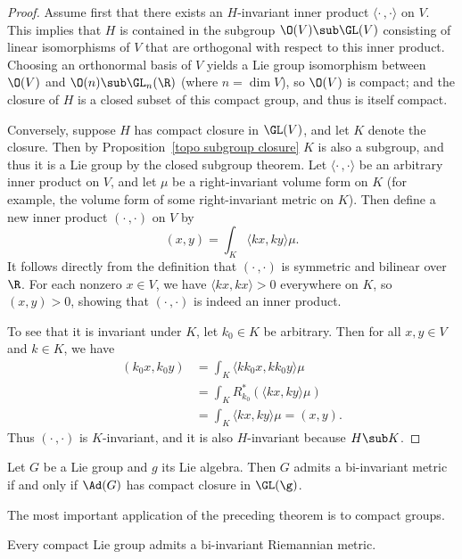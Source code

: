 \begin{proof}
Assume first that there exists an $H$-invariant inner product $\langle\cdot\,,\cdot\rangle$ 
on $V$. This implies that $H$ is contained in the subgroup $\O(V)\sub\GL(V)$ consisting of 
linear isomorphisms of $V$ that are orthogonal with respect to this inner product. Choosing an 
orthonormal basis of $V$ yields a Lie group isomorphism between $\O(V)$ and $\O(n)\sub\GL_n(\R)$ 
(where $n=\dim V$), so $\O(V)$ is compact; and the closure of $H$ is a closed subset of this 
compact group, and thus is itself compact.\par
Conversely, suppose $H$ has compact closure in $\GL(V)$, and let $K$ denote the closure. Then 
by Proposition~\ref{topo subgroup closure} $K$ is also a subgroup, and thus it is a Lie group 
by the closed subgroup theorem. Let $\langle\cdot\,,\cdot\rangle$ be an arbitrary inner 
product on $V$, and let $\mu$ be a right-invariant volume form on $K$ (for example, the 
volume form of some right-invariant metric on $K$). Then define a new inner product 
$(\cdot\,,\cdot)$ on $V$ by
\[(x,y)=\int_K\langle kx,ky\rangle\mu.\]
It follows directly from the definition that $(\cdot\,,\cdot)$ is symmetric and bilinear 
over $\R$. For each nonzero $x\in V$, we have $\langle kx,kx\rangle>0$ everywhere on $K$, so $(x,y)>0$, 
showing that $(\cdot\,,\cdot)$ is indeed an inner product.\par
To see that it is invariant under $K$, let $k_0\in K$ be arbitrary. Then for all $x,y\in V$ and 
$k\in K$, we have
\begin{align*}
(k_0x,k_0y)&=\int_K\langle kk_0x,kk_0y\rangle\mu\\
&=\int_KR_{k_0}^*(\langle kx,ky\rangle\mu)\\
&=\int_K\langle kx,ky\rangle\mu=(x,y).
\end{align*}
Thus $(\cdot\,,\cdot)$ is $K$-invariant, and it is also $H$-invariant because $H\sub K$.
\end{proof}
\begin{theorem}\label{Riemann metric bi-inv exist}
Let $G$ be a Lie group and $g$ its Lie algebra. Then $G$ admits a bi-invariant metric if 
and only if $\Ad(G)$ has compact closure in $\GL(\g)$.
\end{theorem}
The most important application of the preceding theorem is to compact groups.
\begin{corollary}\label{Riemann metric bi-inv compact group}
Every compact Lie group admits a bi-invariant Riemannian metric.
\end{corollary}
